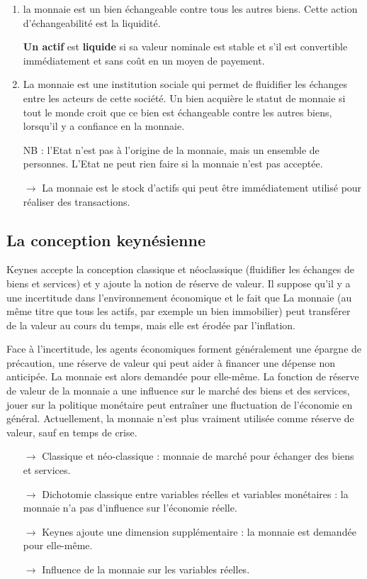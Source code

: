 	\begin{enumerate}
		\item la monnaie est un bien échangeable contre tous les autres biens. Cette action d'échangeabilité est la liquidité.
		
		\textbf{Un actif} est \textbf{liquide} si sa valeur nominale est stable et s'il est convertible immédiatement et sans coût en un moyen de payement.
		
		\item La monnaie est une institution sociale qui permet de fluidifier les échanges entre les acteurs de cette société. Un bien acquière le statut de monnaie si tout le monde croit que ce bien est échangeable contre les autres biens, lorsqu'il y a confiance en la monnaie.
		
		NB : l'Etat n'est pas à l'origine de la monnaie, mais un ensemble de personnes. L'Etat ne peut rien faire si la monnaie n'est pas acceptée.
		
		\item[$\rightarrow$] La monnaie est le stock d'actifs qui peut être immédiatement utilisé pour réaliser des transactions.
	\end{enumerate}
	
		
	\subsection{La conception keynésienne}
	
	Keynes accepte la conception classique et néoclassique (fluidifier les échanges de biens et services) et y ajoute  la notion de réserve de valeur. Il suppose qu'il y a une incertitude dans l'environnement économique et le fait que La monnaie (au même titre que tous les actifs, par exemple un bien immobilier) peut transférer de la valeur au cours du temps, mais elle est érodée par l'inflation. 
	
	Face à l'incertitude, les agents économiques forment généralement une épargne de précaution, une réserve de valeur qui peut aider à financer une dépense non anticipée. La monnaie est alors demandée pour elle-même. La fonction de réserve de valeur de la monnaie a une influence sur le marché des biens et des services, jouer sur la politique monétaire peut entraîner une fluctuation de l'économie en général. Actuellement, la monnaie n'est plus vraiment utilisée comme réserve de valeur, sauf en temps de crise.
	
	\begin{itemize}
		\item[$\rightarrow$] Classique et néo-classique : monnaie de marché pour échanger des biens et services.
		\item[$\rightarrow$] Dichotomie classique entre variables réelles et variables monétaires : la monnaie n'a pas d'influence sur l'économie réelle.
		\item[$\rightarrow$] Keynes ajoute une dimension supplémentaire : la monnaie est demandée pour elle-même.
		\item[$\rightarrow$] Influence de la monnaie sur les variables réelles.
	\end{itemize}

